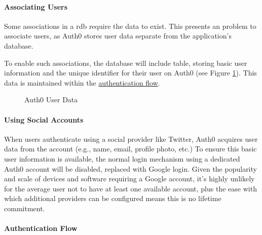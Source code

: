 \paragraph{Associating Users}
Some associations in a \gls{rdb} require the data to exist.
This presents an problem to associate users, as Auth0
stores user data separate from the application's database.

To enable such associations, the database will include
 table, storing basic user information and the
unique identifier for their user on Auth0 (see Figure
\ref{fig:auth0Data}).
This data is maintained within the
\hyperref[p:authFlow]{authentication flow}.

\begin{figure}[h]
  \centering
  \codesize
  
  \caption{Auth0 User Data}
  \label{fig:auth0Data}
\end{figure}

\paragraph{Using Social Accounts}
When users authenticate using a social provider like
Twitter, Auth0 acquires user data from the account (e.g.,
name, email, profile photo, etc.)
To ensure this basic user information is available, the
normal login mechanism using a dedicated Auth0 account will
be disabled, replaced with Google login.
Given the popularity and scale of devices and software
requiring a Google account, it's highly unlikely for the
average user not to have at least one available account,
plus the ease with which additional providers can be
configured means this is no lifetime commitment.

\paragraph{Authentication Flow}
\label{p:authFlow}

